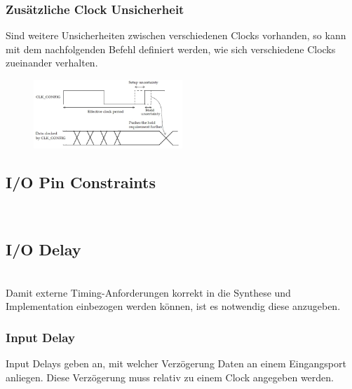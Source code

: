 \begin{multicols}{2}
    \subsubsection{Zusätzliche Clock Unsicherheit}
    Sind weitere Unsicherheiten zwischen verschiedenen Clocks vorhanden, so kann mit dem nachfolgenden Befehl definiert werden, wie sich verschiedene Clocks zueinander verhalten.
    
    \begin{figure}[H]
        \includegraphics[width=0.5\textwidth]{images/clock_uncertainty.png}
    \end{figure}
\end{multicols}

\subsection{I/O Pin Constraints}$~$ \\


\subsection{I/O Delay}$~$ \\
Damit externe Timing-Anforderungen korrekt in die Synthese und Implementation einbezogen werden können, ist es notwendig diese anzugeben.

\subsubsection{Input Delay} \label{chapter:input_delay}
Input Delays geben an, mit welcher Verzögerung Daten an einem Eingangsport anliegen. Diese Verzögerung muss relativ zu einem Clock angegeben werden.

